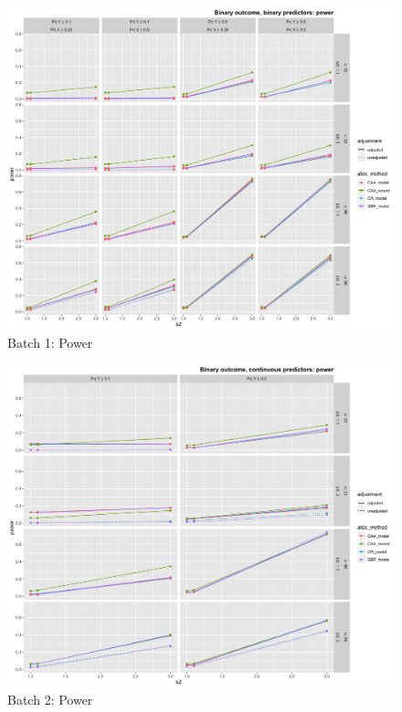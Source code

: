 \begin{figure}[H]
	\includegraphics[width=\linewidth]{figures/b1_power_all_methods_adj_unadj}
	\caption{Batch 1: Power}
	\label{fig:b1p}
\end{figure}

\begin{figure}[H]
	\includegraphics[width=\linewidth]{figures/b2_power_all_methods_adj_unadj}
	\caption{Batch 2: Power}
	\label{fig:b2p}
\end{figure}

